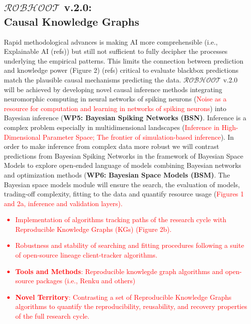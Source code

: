 \documentclass[12pt, a4paper]{article} %
\begin{document}
\subsection{{\bf $\mathcal{ROBHOOT}$ v.2.0}: \\ Causal Knowledge Graphs}

Rapid methodological advances is making AI more comprehensible (i.e.,
Explainable AI (refs)) but still not sufficient to fully decipher the
processes underlying the empirical patterns. This limits the
connection between prediction and knowledge power (Figure 2) (refs)
critical to evaluate blackbox predictions match the plausible causal
mechanisms predicting the data. $\mathcal{ROBHOOT}$ v.2.0 will be
achieved by developing novel causal inference methods integrating
neuromorphic computing in neural networks of spiking neurons
(\textcolor{red}{Noise as a resource for computation and learning in
  networks of spiking neurons}) into Bayesian inference ({\bf WP5:
  Bayesian Spiking Networks (BSN)}. Inference is a complex problem
especially in multidimensional landscapes (\textcolor{red}{Inference
  in High-Dimensional Parameter Space; The frontier of
  simulation-based inference}). In order to make inference from
complex data more robust we will contrast predictions from Bayesian
Spiking Networks in the framework of Bayesian Space Models to explore
open-ended language of models combining Bayesian networks and
optimization methods ({\bf WP6: Bayesian Space Models (BSM)}. The
Bayesian space models module will ensure the search, the evaluation of
models, trading-off complexity, fitting to the data and quantify
resource usage (\textcolor{red}{Figures 1 and 2a, inference and
  validation layers).}
  
\textcolor{red}{
  \begin{itemize}
  \item Implementation of algorithms tracking paths of the research
    cycle with Reproducible Knowledge Graphs (KGs) (Figure 2b).
  \item Robustness and stability of searching and fitting procedures
    following a suite of open-source lineage client-tracker
    algorithms.
   \item {\bf Tools and Methods}: Reproducible knowlegde graph
     algorithms and open-source packages (i.e., Renku and others)
    \item {\bf Novel Territory}: Contrasting a set of Reproducible
      Knowledge Graphs algorithms to quantify the reproducibility,
      reusability, and recovery properties of the full research cycle.
   \end{itemize}}
\end{document}
